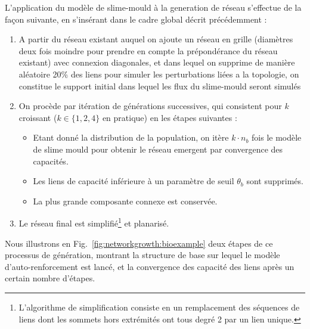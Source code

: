 L'application du modèle de slime-mould à la generation de réseau s'effectue de la façon suivante, en s'insérant dans le cadre global décrit précédemment :

\begin{enumerate}
	\item A partir du réseau existant auquel on ajoute un réseau en grille (diamètres deux fois moindre pour prendre en compte la prépondérance du réseau existant) avec connexion diagonales, et dans lequel on supprime de manière aléatoire 20\% des liens pour simuler les perturbations liées a la topologie, on constitue le support initial dans lequel les flux du slime-mould seront simulés 
	\item On procède par itération de générations successives, qui consistent pour $k$ croissant ($k\in \{ 1,2,4 \}$ en pratique) en les étapes suivantes :
	\begin{itemize}
		\item Etant donné la distribution de la population, on itère $k\cdot n_b$ fois le modèle de slime mould pour obtenir le réseau emergent par convergence des capacités.
		\item Les liens de capacité inférieure à un paramètre de seuil $\theta_b$ sont supprimés.
		\item La plus grande composante connexe est conservée.
	\end{itemize}
	\item Le réseau final est simplifié\footnote{L'algorithme de simplification consiste en un remplacement des séquences de liens dont les sommets hors extrémités ont tous degré 2 par un lien unique.} et planarisé.
\end{enumerate}

Nous illustrons en Fig.~\ref{fig:networkgrowth:bioexample} deux étapes de ce processus de génération, montrant la structure de base sur lequel le modèle d'auto-renforcement est lancé, et la convergence des capacité des liens après un certain nombre d'étapes.



